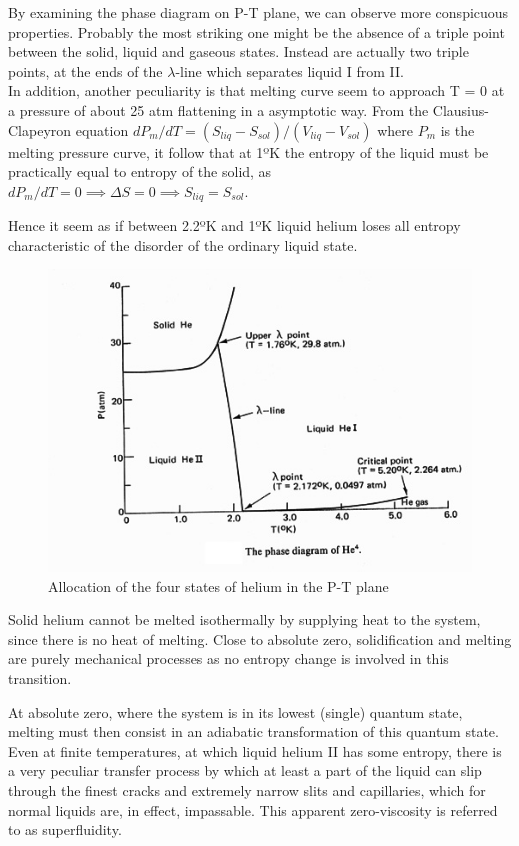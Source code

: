 \documentclass{article}
\begin{document}
By examining the phase diagram on P-T plane, we can observe more conspicuous properties. Probably the most striking one might be the absence of a triple point between the solid, liquid and gaseous states. Instead are actually two triple points, at the ends of the $\lambda$-line which separates liquid  I from  II\@.
\\

In addition, another peculiarity is that melting curve seem to approach T = 0 at a pressure of about 25 atm flattening in a asymptotic way. From the Clausius-Clapeyron equation $dP_m / dT =(S_{liq}-S_{sol})/(V_{liq}-V_{sol})$ where $P_m$ is the melting pressure curve, it follow that at 1ºK the entropy of the liquid must be practically equal to entropy of the solid, as $dP_m / dT = 0 \implies \Delta S = 0 \implies S_{liq}=S_{sol}$.

Hence it seem as if between 2.2ºK and 1ºK liquid helium loses all entropy characteristic of the disorder of the ordinary liquid state.
\\

\begin{figure}[H]
    \centering
    \includegraphics[width=0.75\linewidth]{Images/PhaseDiagr.png}
    \caption{Allocation of the four states of helium in the P-T plane}
    \label{fig:enter-label}
\end{figure}

Solid helium cannot be melted isothermally by supplying heat to the system, since there is no heat of melting. Close to absolute zero, solidification and melting are purely mechanical processes as no entropy change is involved in this transition.

At absolute zero, where the system is in its lowest (single) quantum state, melting must then consist in an adiabatic transformation of this quantum state. Even at finite temperatures, at which liquid helium II has some entropy, there is a very peculiar transfer process by which at least a part of the liquid can slip through the finest cracks and extremely narrow slits and capillaries, which for normal liquids are, in effect, impassable. This apparent zero-viscosity is referred to as superfluidity.
\\
\end{document}
